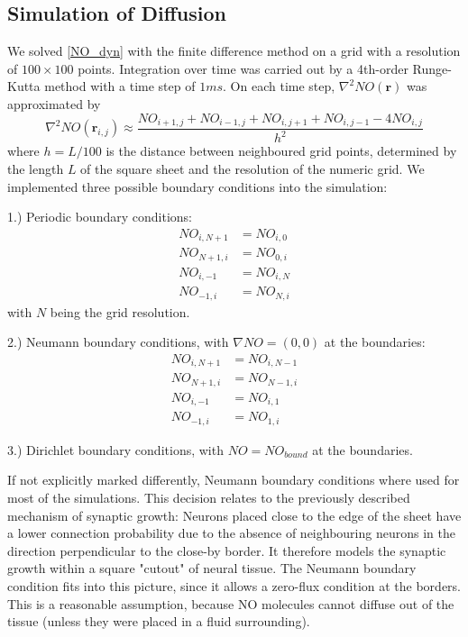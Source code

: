 \documentclass[10pt,a4paper]{article}
\begin{document}
\subsection{Simulation of Diffusion}

We solved \eqref{NO_dyn} with the finite difference method on a grid with a resolution of $100\times 100$ points. Integration over time was carried out by a 4th-order Runge-Kutta method with a time step of $1 ms$. On each time step, $\nabla^2 NO(\mathbf{r})$ was approximated by
\begin{equation}
\nabla^2 NO(\mathbf{r}_{i,j}) \approx \frac{NO_{i+1,j}+NO_{i-1,j}+NO_{i,j+1}+NO_{i,j-1}-4NO_{i,j}}{h^2}
\label{Laplace_Numeric}
\end{equation}
where $h = L/100$ is the distance between neighboured grid points, determined by the length $L$ of the square sheet and the resolution of the numeric grid. We implemented three possible boundary conditions into the simulation:

1.) Periodic boundary conditions:
\begin{align}
NO_{i,N+1} &= NO_{i,0} \label{Periodic_Cond_1} \\
NO_{N+1,i} &= NO_{0,i} \label{Periodic_Cond_2} \\
NO_{i,-1} &= NO_{i,N} \label{Periodic_Cond_3} \\
NO_{-1,i} &= NO_{N,i} \label{Periodic_Cond_4}
\end{align}
with $N$ being the grid resolution.

2.) Neumann boundary conditions, with $\nabla NO = (0,0)$ at the boundaries:
\begin{align}
NO_{i,N+1} &= NO_{i,N-1} \label{Neumann_Cond_1} \\
NO_{N+1,i} &= NO_{N-1,i} \label{Neumann_Cond_2} \\
NO_{i,-1} &= NO_{i,1} \label{Neumann_Cond_3} \\
NO_{-1,i} &= NO_{1,i} \label{Neumann_Cond_4}
\end{align}

3.) Dirichlet boundary conditions, with $NO = NO_{bound}$ at the boundaries.

If not explicitly marked differently, Neumann boundary conditions where used for most of the simulations. This decision relates to the previously described mechanism of synaptic growth: Neurons placed close to the edge of the sheet have a lower connection probability due to the absence of neighbouring neurons in the direction perpendicular to the close-by border. It therefore models the synaptic growth within a square "cutout" of neural tissue. The Neumann boundary condition fits into this picture, since it allows a zero-flux condition at the borders. This is a reasonable assumption, because NO molecules cannot diffuse out of the tissue (unless they were placed in a fluid surrounding).
\end{document}
